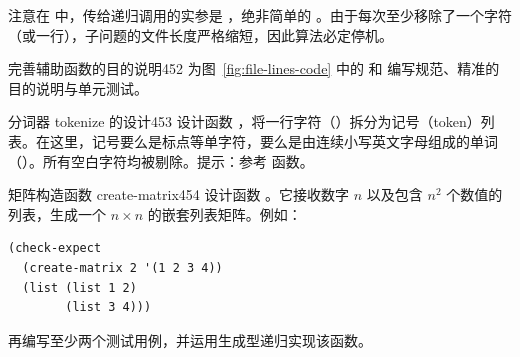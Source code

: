注意在  中，传给递归调用的实参是 ，绝非简单的 。由于每次至少移除了一个字符（或一行），子问题的文件长度严格缩短，因此算法必定停机。

\begin{exercise}{完善辅助函数的目的说明}{452}\label{ex:452}
为图~\ref{fig:file-lines-code} 中的  和  编写规范、精准的目的说明与单元测试。
\end{exercise}

\begin{exercise}{分词器 tokenize 的设计}{453}\label{ex:453}
设计函数 ，将一行字符（）拆分为记号（token）列表。在这里，记号要么是标点等单字符，要么是由连续小写英文字母组成的单词（）。所有空白字符均被剔除。提示：参考  函数。
\end{exercise}

\begin{exercise}{矩阵构造函数 create-matrix}{454}\label{ex:454}
设计函数 。它接收数字 $n$ 以及包含 $n^2$ 个数值的列表，生成一个 $n \times n$ 的嵌套列表矩阵。例如：
\begin{lstlisting}[language=BSL]
(check-expect
  (create-matrix 2 '(1 2 3 4))
  (list (list 1 2)
        (list 3 4)))
\end{lstlisting}
再编写至少两个测试用例，并运用生成型递归实现该函数。
\end{exercise}

